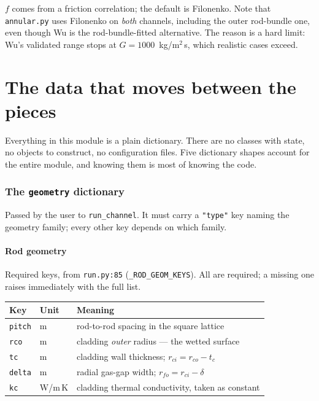 \documentclass[11pt]{article}
\newcommand{\code}[1]{\texttt{#1}}
\begin{document}
$f$ comes from a friction correlation; the default is Filonenko. Note that
\code{annular.py} uses Filonenko on \emph{both} channels, including the outer rod-bundle
one, even though Wu is the rod-bundle-fitted alternative. The reason is a hard limit:
Wu's validated range stops at $G = 1000$~kg/m$^2$\,s, which realistic cases exceed.

\newpage
\part{The data that moves between the pieces}
\label{part:data}

\noindent
Everything in this module is a plain dictionary. There are no classes with state, no
objects to construct, no configuration files. Five dictionary shapes account for the
entire module, and knowing them is most of knowing the code.

\section{The \code{geometry} dictionary}

Passed by the user to \code{run\_channel}. It must carry a \code{"type"} key naming the
geometry family; every other key depends on which family.

\subsection{Rod geometry}
Required keys, from \code{run.py:85} (\code{\_ROD\_GEOM\_KEYS}). All are required; a
missing one raises immediately with the full list.

\begin{center}
\begin{tabular}{llp{7.0cm}}
\toprule
Key & Unit & Meaning \\
\midrule
\code{pitch} & m & rod-to-rod spacing in the square lattice \\
\code{rco}   & m & cladding \emph{outer} radius --- the wetted surface \\
\code{tc}    & m & cladding wall thickness; $r_{ci} = r_{co} - t_c$ \\
\code{delta} & m & radial gas-gap width; $r_{fo} = r_{ci} - \delta$ \\
\code{kc}    & W/m\,K & cladding thermal conductivity, taken as constant \\
\bottomrule
\end{tabular}
\end{center}
\end{document}
